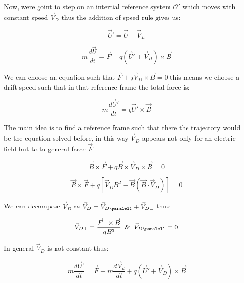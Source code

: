 \documentclass[spanish,notitlepage,letterpaper,11pt]{article} %
\numberwithin{equation}{subsection}
\begin{document}
            Now, were goint to step on an intertial reference system $\mathcal{O}'$ which moves with constant speed $\Vec{V}_D$ thus the addition of speed rule gives us:

            \begin{equation*}
                \Vec{U}' = \Vec{U} - \Vec{V}_D
            \end{equation*}

            \begin{equation}
                m\frac{d\Vec{U}}{dt} = \Vec{F} + q(\Vec{U}' + \Vec{V}_D)\times\Vec{B}
            \end{equation}

            We can choose an equation such that $\Vec{F} + q\Vec{V}_D\times\Vec{B} = 0$ this means we choose a drift speed such that in that reference frame the total force is:

            \begin{equation}
                m\frac{d\Vec{U}'}{dt} = q\Vec{U}'\times\Vec{B}
            \end{equation}

            The main idea is to find a reference frame such that there the trajectory would be the equation solved before, in this way $\Vec{V}_D$ appears not only for an electric field but to ta general force $\Vec{F}$

            \begin{equation}
                \Vec{B}\times\Vec{F} + q\Vec{B}\times\Vec{V}_D\times\Vec{B} = 0
            \end{equation}

            \begin{equation*}
                \Vec{B}\times\Vec{F} + q[\Vec{V}_DB^2 - \Vec{B}(\Vec{B}\cdot\Vec{V}_D)] = 0
            \end{equation*}

            We can decompose $\Vec{V}_D$ as $\Vec{V}_D = \Vec{V}_{D\paralell} + \Vec{V}_{D\perp}$ thus:

            \begin{equation}
                \Vec{V}_{D\perp} = \frac{\Vec{F}_{\perp}\times\Vec{B}}{qB^2} \;\;\&\;\; \Vec{V}_{D\paralell} = 0
            \end{equation}

            In general $\Vec{V}_D$ is not constant thus:

            \begin{equation}
                m\frac{d\Vec{U}'}{dt} = \Vec{F} - m\frac{d\Vec{V}_d}{dt} + q(\Vec{U}' + \Vec{V}_D)\times\Vec{B}
            \end{equation}
\end{document}
